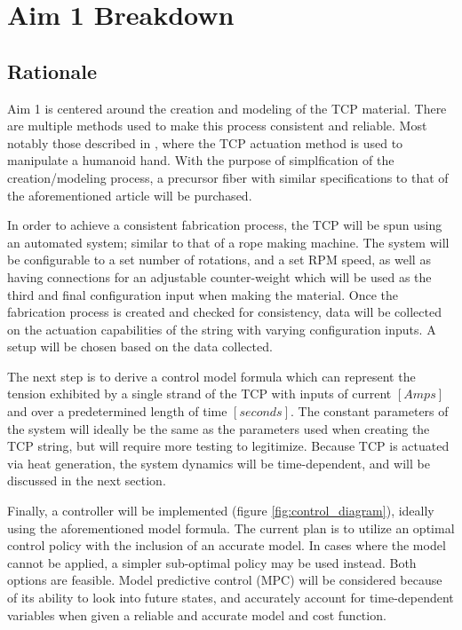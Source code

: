 \section{Aim 1 Breakdown}

\subsection{Rationale}

	Aim 1 is centered around the creation and modeling of the TCP material. There are multiple methods used to make this process consistent and reliable. Most notably those described in \cite{wu_compact_2017}, where the TCP actuation method is used to manipulate a humanoid hand. With the purpose of simplfication of the creation/modeling process, a precursor fiber with similar specifications to that of the aforementioned article will be purchased.

	In order to achieve a consistent fabrication process, the TCP will be spun using an automated system; similar to that of a rope making machine. The system will be configurable to a set number of rotations, and a set RPM speed, as well as having connections for an adjustable counter-weight which will be used as the third and final configuration input when making the material. Once the fabrication process is created and checked for consistency, data will be collected on the actuation capabilities of the string with varying configuration inputs. A setup will be chosen based on the data collected.

	The next step is to derive a control model formula which can represent the tension exhibited by a single strand of the TCP with inputs of current $[Amps]$ and over a predetermined length of time $[seconds]$. The constant parameters of the system will ideally be the same as the parameters used when creating the TCP string, but will require more testing to legitimize. Because TCP is actuated via heat generation, the system dynamics will be time-dependent, and will be discussed in the next section.

	Finally, a controller will be implemented (figure \ref{fig:control_diagram}), ideally using the aforementioned model formula. The current plan is to utilize an optimal control policy with the inclusion of an accurate model. In cases where the model cannot be applied, a simpler sub-optimal policy may be used instead. Both options are feasible. Model predictive control (MPC) will be considered because of its ability to look into future states, and accurately account for time-dependent variables when given a reliable and accurate model and cost function.

